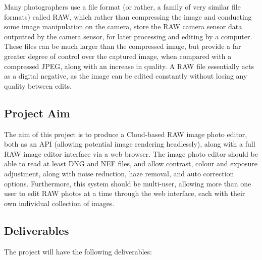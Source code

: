 \documentclass[12pt,a4paper]{article}
\begin{document}
Many photographers use a file format (or rather, a family of very similar file formats) called RAW,
which rather than compressing the image and conducting some image manipulation on the camera,
store the RAW camera sensor data outputted by the camera sensor, for later processing and editing
by a computer. These files can be much larger than the compressed image, but provide a far greater
degree of control over the captured image, when compared with a compressed JPEG, along with an
increase in quality. A RAW file essentially acts as a digital negative, as the image can be edited
constantly without losing any quality between edits.  \cite{AllAboutTheFormat}





\subsection{Project Aim}
The aim of this project is to produce a Cloud-based RAW image photo editor, both as an API (allowing potential
image rendering headlessly), along with a full RAW image editor interface via a web browser. The image photo editor
should be able to read at least DNG and NEF files, and allow contrast, colour and exposure adjustment, along with
noise reduction, haze removal, and auto correction options. Furthermore, this system should be multi-user, allowing more than
one user to edit RAW photos at a time through the web interface, each with their own individual collection of images.

\subsection{Deliverables}
The project will have the following deliverables:
\end{document}
